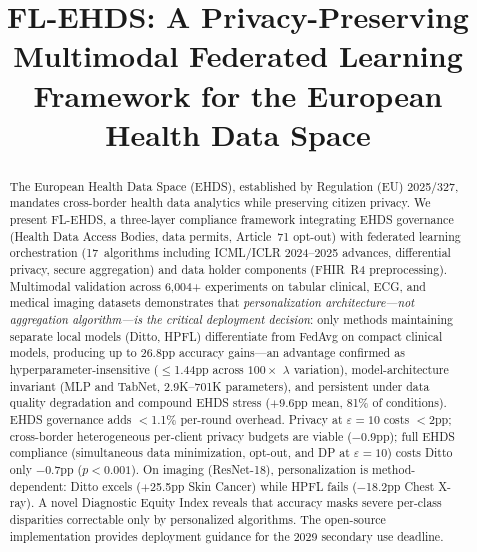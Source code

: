 \documentclass[conference]{IEEEtran}
\begin{document}
\title{FL-EHDS: A Privacy-Preserving Multimodal Federated Learning Framework for the European Health Data Space}

\author{
}

\maketitle

\begin{abstract}
The European Health Data Space (EHDS), established by Regulation (EU) 2025/327, mandates cross-border health data analytics while preserving citizen privacy. We present FL-EHDS, a three-layer compliance framework integrating EHDS governance (Health Data Access Bodies, data permits, Article~71 opt-out) with federated learning orchestration (17~algorithms including ICML/ICLR 2024--2025 advances, differential privacy, secure aggregation) and data holder components (FHIR~R4 preprocessing). Multimodal validation across 6,004+ experiments on tabular clinical, ECG, and medical imaging datasets demonstrates that \textit{personalization architecture---not aggregation algorithm---is the critical deployment decision}: only methods maintaining separate local models (Ditto, HPFL) differentiate from FedAvg on compact clinical models, producing up to 26.8pp accuracy gains---an advantage confirmed as hyperparameter-insensitive ($\leq$1.44pp across $100\times$ $\lambda$ variation), model-architecture invariant (MLP and TabNet, 2.9K--701K parameters), and persistent under data quality degradation and compound EHDS stress ($+$9.6pp mean, 81\% of conditions). EHDS governance adds $<$1.1\% per-round overhead. Privacy at $\varepsilon{=}10$ costs $<$2pp; cross-border heterogeneous per-client privacy budgets are viable ($-$0.9pp); full EHDS compliance (simultaneous data minimization, opt-out, and DP at $\varepsilon{=}10$) costs Ditto only $-$0.7pp ($p{<}0.001$). On imaging (ResNet-18), personalization is method-dependent: Ditto excels ($+$25.5pp Skin Cancer) while HPFL fails ($-$18.2pp Chest X-ray). A novel Diagnostic Equity Index reveals that accuracy masks severe per-class disparities correctable only by personalized algorithms. The open-source implementation provides deployment guidance for the 2029 secondary use deadline.
\end{abstract}
\end{document}
